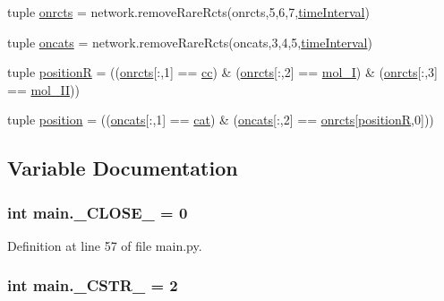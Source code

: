 \begin{DoxyCompactItemize}
\item 
tuple \hyperlink{a00111_ab26ffc3eda5d201a779d705813b06348}{onrcts} = network.\-remove\-Rare\-Rcts(onrcts,5,6,7,\hyperlink{a00111_a5ba0cd0b7538ed8047b2fea322ecb4b7}{time\-Interval})
\item 
tuple \hyperlink{a00111_ab4d380bc4bfcb970acc39ddf18a73972}{oncats} = network.\-remove\-Rare\-Rcts(oncats,3,4,5,\hyperlink{a00111_a5ba0cd0b7538ed8047b2fea322ecb4b7}{time\-Interval})
\item 
tuple \hyperlink{a00111_adbbdc0f6ad0f08400b3e492f7a807a6b}{position\-R} = ((\hyperlink{a00111_ab26ffc3eda5d201a779d705813b06348}{onrcts}\mbox{[}\-:,1\mbox{]} == \hyperlink{a00022_afb5980388a6e55ca55437b53cdaf528a}{cc}) \& (\hyperlink{a00111_ab26ffc3eda5d201a779d705813b06348}{onrcts}\mbox{[}\-:,2\mbox{]} == \hyperlink{a00022_ab346189eef5359a07ba32144ddcd4465}{mol\-\_\-\-I}) \& (\hyperlink{a00111_ab26ffc3eda5d201a779d705813b06348}{onrcts}\mbox{[}\-:,3\mbox{]} == \hyperlink{a00022_a4d2c086887289f8900b38ffa56854da3}{mol\-\_\-\-I\-I}))
\item 
tuple \hyperlink{a00111_ac67c60df3cc9afae7e4888d2b48b846d}{position} = ((\hyperlink{a00111_ab4d380bc4bfcb970acc39ddf18a73972}{oncats}\mbox{[}\-:,1\mbox{]} == \hyperlink{a00022_a7073f71a43389f3032e69b1fffc2551a}{cat}) \& (\hyperlink{a00111_ab4d380bc4bfcb970acc39ddf18a73972}{oncats}\mbox{[}\-:,2\mbox{]} == \hyperlink{a00111_ab26ffc3eda5d201a779d705813b06348}{onrcts}\mbox{[}\hyperlink{a00111_adbbdc0f6ad0f08400b3e492f7a807a6b}{position\-R},0\mbox{]}))
\end{DoxyCompactItemize}


\subsection{Variable Documentation}
\hypertarget{a00111_a05832bb8aa5b5b63ca022653c9b32af5}{
\subsubsection[{\-\_\-\-C\-L\-O\-S\-E\-\_\-}]{\setlength{\rightskip}{0pt plus 5cm}int main.\-\_\-\-C\-L\-O\-S\-E\-\_\- = 0}}\label{a00111_a05832bb8aa5b5b63ca022653c9b32af5}


Definition at line 57 of file main.\-py.

\hypertarget{a00111_a4994448f45a50087ae8864153ab89e10}{
\subsubsection[{\-\_\-\-C\-S\-T\-R\-\_\-}]{\setlength{\rightskip}{0pt plus 5cm}int main.\-\_\-\-C\-S\-T\-R\-\_\- = 2}}\label{a00111_a4994448f45a50087ae8864153ab89e10}


